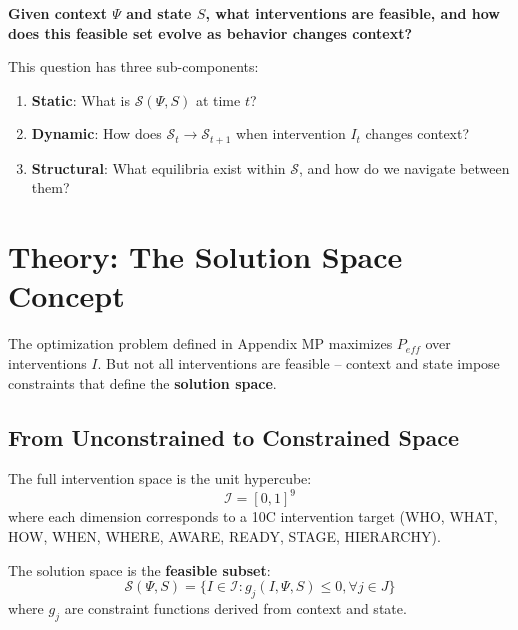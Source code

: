 \begin{tcolorbox}[colback=yellow!10, colframe=orange!75!black, title=Fundamental Question]
\textbf{Given context $\Psi$ and state $S$, what interventions are feasible, and how does this feasible set evolve as behavior changes context?}

This question has three sub-components:
\begin{enumerate}
    \item \textbf{Static}: What is $\mathcal{S}(\Psi, S)$ at time $t$?
    \item \textbf{Dynamic}: How does $\mathcal{S}_t \to \mathcal{S}_{t+1}$ when intervention $I_t$ changes context?
    \item \textbf{Structural}: What equilibria exist within $\mathcal{S}$, and how do we navigate between them?
\end{enumerate}
\end{tcolorbox}

\section{Theory: The Solution Space Concept}
\label{sec:ss-theory}

The optimization problem defined in Appendix MP maximizes $P_{eff}$ over interventions $I$. But not all interventions are feasible -- context and state impose constraints that define the \textbf{solution space}.

\subsection{From Unconstrained to Constrained Space}

The full intervention space is the unit hypercube:
\begin{equation}
\mathcal{I} = [0,1]^9
\end{equation}
where each dimension corresponds to a 10C intervention target (WHO, WHAT, HOW, WHEN, WHERE, AWARE, READY, STAGE, HIERARCHY).

The solution space is the \textbf{feasible subset}:
\begin{equation}
\mathcal{S}(\Psi, S) = \{I \in \mathcal{I} : g_j(I, \Psi, S) \leq 0, \forall j \in J\}
\end{equation}
where $g_j$ are constraint functions derived from context and state.

